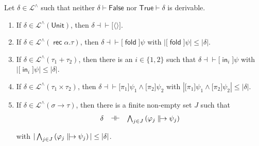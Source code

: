 \documentclass[%
  a4paper,
  UKenglish,
  cleveref,
  autoref,
  thm-restate,
  numberwithinsect,
]{lipics-v2021}
\newcommand\thesis{\vdash}
\newcommand\defthesisiff{\dashv\vdash}
\newcommand\thesisiff{\mathrel{\defthesisiff}}
\newcommand\pair[1]{{\langle #1\rangle}}
\newcommand\temp[1]{\mathsf{#1}}
\newcommand\True{\temp{True}}
\newcommand\False{\temp{False}}
\newcommand\term[1]{\mathsf{#1}}
\newcommand\type[1]{\term{#1}}
\newcommand\inj{\mathop{\term{in}}}
\newcommand\fold{\mathop{\term{fold}}}
\newcommand\arrow\to
\newcommand\Unit{\type{Unit}}
\newcommand\rec{\mathop{\type{rec}}}	%
\newcommand\TV{\alpha}		%
\newcommand\defrealto{\mathrel\parallel\joinrel\to}
\newcommand\realto{\mathrel{\defrealto}}
\newcommand\PT{\tau}		%
\newcommand\PTbis{\sigma}	%
\newcommand\Lang{\mathcal{L}}
\newcommand\form[1]{\lbrack #1 \rbrack}
\begin{document}
\begin{lemma}
\label{lem:proof:sem:log:compl:nf}
Let $\delta \in \Lang^\land$ such that neither $\delta \thesis \False$
nor $\True \thesis \delta$ is derivable.
\begin{enumerate}[(1)]
\item
\label{item:proof:sem:log:compl:nf:unit}
If $\delta \in \Lang^\land(\Unit)$,
then $\delta \thesisiff \form{\pair{}}$.

\item
\label{item:proof:sem:log:compl:nf:rec}
If $\delta \in \Lang^\land(\rec \TV.\PT)$,
then
$\delta \thesisiff \form{\fold}\psi$
with $|\form{\fold}\psi| \leq |\delta|$.


\item
\label{item:proof:sem:log:compl:nf:plus}
If $\delta \in \Lang^\land(\PT_1 + \PT_2)$,
then there is an $i \in \{1,2\}$
such that
$\delta \thesisiff \form{\inj_i}\psi$
with $|\form{\inj_i}\psi| \leq |\delta|$.


\item
\label{item:proof:sem:log:compl:nf:times}
If $\delta \in \Lang^\land(\PT_1 \times \PT_2)$,
then
$\delta \thesisiff \form{\pi_1}\psi_1 \land \form{\pi_2}\psi_2$
with
\(
  |\form{\pi_1}\psi_1 \land \form{\pi_2}\psi_2| \leq |\delta|
\).


\item
\label{item:proof:sem:log:compl:nf:arrow}
If $\delta \in \Lang^\land(\PTbis \arrow \PT)$,
then there is a finite non-empty set $J$ such that
\[
\begin{array}{l l l}
  \delta
& \thesisiff
& \bigwedge_{j \in J} \left(\varphi_j \realto \psi_j\right)
\end{array}
\]

\noindent
with
\(
  |\bigwedge_{j \in J} \left(\varphi_j \realto \psi_j\right)|
  \leq
  |\delta|
\).
\end{enumerate}
\end{lemma}
\end{document}
